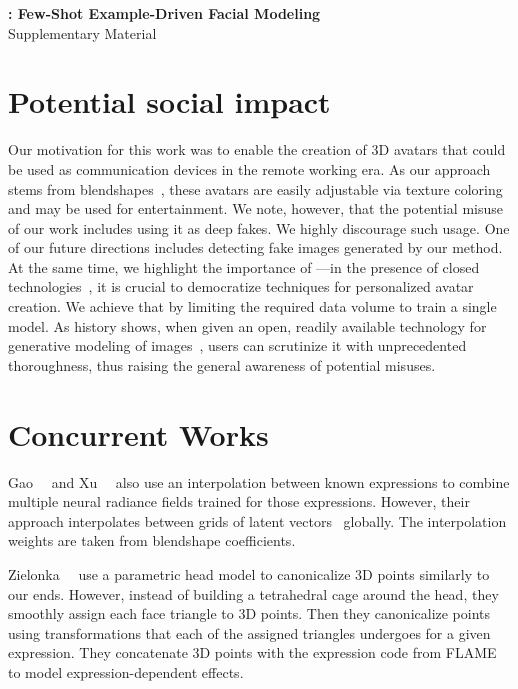 {
\vspace{2.0em}
\centering
\Large
\textbf{\blendfields: Few-Shot Example-Driven Facial Modeling} \\
\vspace{0.5em}
 Supplementary Material \\ \vspace{1.0em} }

 \section{Potential social impact} Our motivation for this work was to enable
 the creation of 3D avatars that could be used as communication devices in the
 remote working era.
  As our approach stems from blendshapes~\cite{lewis2014practice}, these
  avatars are easily adjustable via texture coloring and may be used for
  entertainment.
  We note, however, that the potential misuse of our work includes using it as
  deep fakes.
  We highly discourage such usage.
  One of our future directions includes detecting fake images generated by our
  method.
  At the same time, we highlight the importance of \blendfields---in the
  presence of closed technologies~\cite{ma2021pixel,cao2022authentic}, it is
  crucial to democratize techniques for personalized avatar creation.
  We achieve that by limiting the required data volume to train a single
  model.
  As history shows, when given an open, readily available technology for
  generative modeling of images~\cite{rombach2022high}, users can scrutinize
  it with unprecedented thoroughness, thus raising the general awareness of
  potential misuses.

\section{Concurrent Works}
  Gao~\etal~\cite{gao2022reconstructing} and Xu~\etal~\cite{xu2023avatarmav}
  also use an interpolation between known expressions to combine multiple
  neural radiance fields trained for those expressions.
  However, their approach interpolates between grids of latent
  vectors~\cite{mueller2022instant} globally.
  The interpolation weights are taken from blendshape coefficients.

  Zielonka~\etal~\cite{zielonka2022instant} use a parametric head model to
  canonicalize 3D points similarly to our ends.
  However, instead of building a tetrahedral cage around the head, they
  smoothly assign each face triangle to 3D points.
  Then they canonicalize points using transformations that each of the
  assigned triangles undergoes for a given expression.
  They concatenate 3D points with the expression code from
  FLAME~\cite{li2017flame} to model expression-dependent effects.

